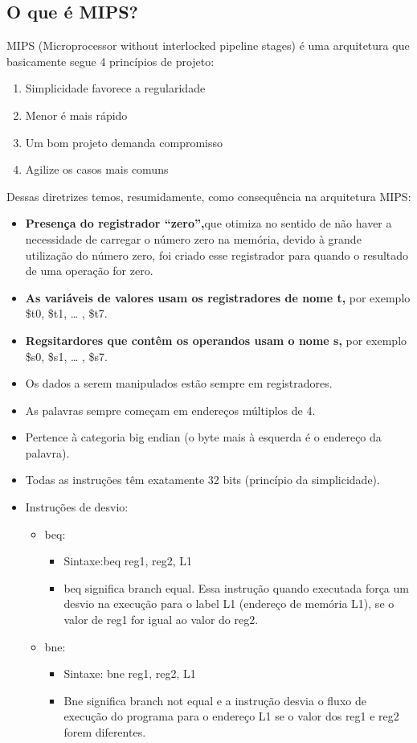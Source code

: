 \documentclass[12pt,a4paper]{article}
\begin{document}
\subsection{O que é MIPS?}
MIPS (Microprocessor without interlocked pipeline stages) é uma arquitetura que basicamente segue 4 princípios de projeto:
\begin{enumerate}
	\item Simplicidade favorece a regularidade
	\item Menor é mais rápido
	\item Um bom projeto demanda compromisso
	\item Agilize os casos mais comuns
\end{enumerate}
Dessas diretrizes temos, resumidamente, como consequência na arquitetura MIPS:
\begin{itemize}
\item \textbf{Presença do registrador “zero”,}que otimiza no sentido de não haver a necessidade de carregar o número zero na memória, devido à grande utilização do número zero, foi criado esse registrador para quando o resultado de uma operação for zero.

\item \textbf{As variáveis de valores usam os registradores de nome t,}  por exemplo \$t0, \$t1, … , \$t7.

\item \textbf{Regsitardores que contêm os operandos usam o nome s,}  por exemplo \$s0, \$s1, … , \$s7.
\item Os dados a serem manipulados estão sempre em registradores.
\item As palavras sempre começam em endereços múltiplos de 4.
\item Pertence à categoria big endian (o byte mais à esquerda é o endereço da palavra).
\item Todas as instruções têm exatamente 32 bits (princípio da simplicidade).
\item Instruções de desvio:
	\begin{itemize}
		\item beq:
		\begin{itemize}
			\item Sintaxe:beq reg1, reg2, L1 
			\item beq significa branch equal. Essa instrução quando executada força um desvio na execução para o label L1 (endereço de memória L1), se o valor de reg1 for igual ao valor do reg2.
		\end{itemize}
		\item bne:
		\begin{itemize}
			\item Sintaxe: bne reg1, reg2, L1 
			\item Bne significa branch not equal e a instrução desvia o fluxo de execução do programa para o endereço L1 se o valor dos reg1 e reg2 forem diferentes.
		\end{itemize}
	\end{itemize}
\end{itemize}
\end{document}
